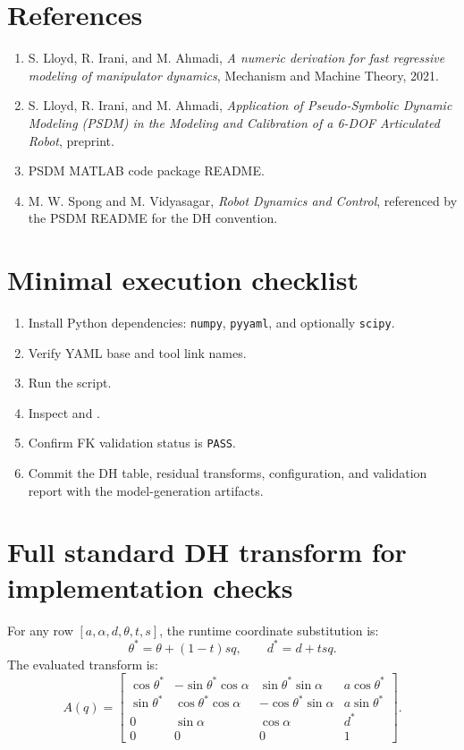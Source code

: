 \documentclass[11pt,a4paper]{article}
\begin{document}
\section{References}

\begin{enumerate}
  \item S. Lloyd, R. Irani, and M. Ahmadi, \emph{A numeric derivation for fast regressive modeling of manipulator dynamics}, Mechanism and Machine Theory, 2021.
  \item S. Lloyd, R. Irani, and M. Ahmadi, \emph{Application of Pseudo-Symbolic Dynamic Modeling (PSDM) in the Modeling and Calibration of a 6-DOF Articulated Robot}, preprint.
  \item PSDM MATLAB code package README.
  \item M. W. Spong and M. Vidyasagar, \emph{Robot Dynamics and Control}, referenced by the PSDM README for the DH convention.
\end{enumerate}

\appendix

\section{Minimal execution checklist}

\begin{enumerate}
  \item Install Python dependencies: \texttt{numpy}, \texttt{pyyaml}, and optionally \texttt{scipy}.
  \item Verify YAML base and tool link names.
  \item Run the script.
  \item Inspect  and .
  \item Confirm FK validation status is \texttt{PASS}.
  \item Commit the DH table, residual transforms, configuration, and validation report with the model-generation artifacts.
\end{enumerate}

\section{Full standard DH transform for implementation checks}

For any row $[a,\alpha,d,\theta,t,s]$, the runtime coordinate substitution is:
\begin{equation}
  \theta^* = \theta + (1-t)sq, \qquad d^* = d + tsq.
\end{equation}
The evaluated transform is:
\begin{equation}
  A(q) =
\begin{bmatrix}
\cos\theta^* & -\sin\theta^*\cos\alpha & \sin\theta^*\sin\alpha & a\cos\theta^* \\
\sin\theta^* & \cos\theta^*\cos\alpha & -\cos\theta^*\sin\alpha & a\sin\theta^* \\
0 & \sin\alpha & \cos\alpha & d^* \\
0 & 0 & 0 & 1
\end{bmatrix}.
\end{equation}
\end{document}
